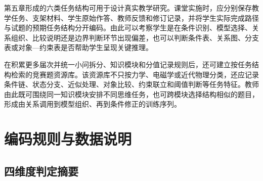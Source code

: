 \documentclass[
  12pt,
  a4paper,twoside,openany]{ctexbook}
\begin{document}
第五章形成的六类任务结构可用于设计真实教学研究。课堂实施时，应分别保存教学任务、支架材料、学生原始作答、教师反馈和修订记录，并将学生实际完成路径与试题的预期任务结构分开编码。由此可以考察学生是在条件识别、模型选择、关系组织、比较说明还是边界判断环节出现偏差，也可以判断条件表、关系图、分支表或对象---约束表是否帮助学生呈现关键推理。

在积累更多届次并统一小问拆分、知识模块和分值记录规则后，还可建立按任务结构检索的竞赛题资源库。该资源库不只按力学、电磁学或近代物理分类，还应记录条件链、状态分支、近似处理、对象比较、约束联立和阈值判断等任务特征。教师由此既可围绕同一知识模块安排不同思维任务，也可跨模块选择结构相似的题目，形成由关系调用到模型组织、再到条件修正的训练序列。

\appendix

\chapter{编码规则与数据说明}\label{ux7f16ux7801ux89c4ux5219ux4e0eux6570ux636eux8bf4ux660e}

\section{四维度判定摘要}\label{ux56dbux7ef4ux5ea6ux5224ux5b9aux6458ux8981}
\end{document}

